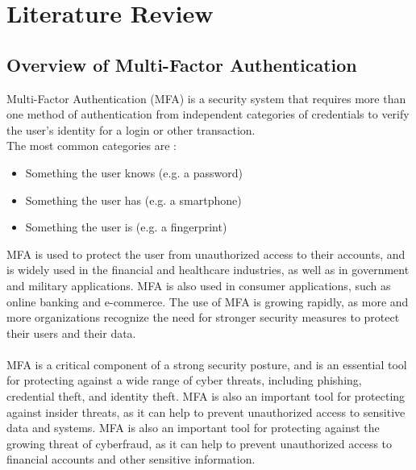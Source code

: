 \documentclass[12pt]{report}
\begin{document}
\newpage
\chapter{Literature Review}
\section{Overview of Multi-Factor Authentication}

Multi-Factor Authentication (MFA) is a security system that requires more than
one method of authentication from independent categories of credentials to verify
the user's identity for a login or other transaction.\\The most common
categories are \cite{mfa}:
\begin{itemize}
	\item Something the user knows (e.g. a password)

	\item Something the user has (e.g. a smartphone)

	\item Something the user is (e.g. a fingerprint)
\end{itemize}
MFA is used to protect the user from unauthorized access to their accounts,
and is widely used in the financial and healthcare industries, as well as in government
and military applications. MFA is also used in consumer applications, such as online
banking and e-commerce. The use of MFA is growing rapidly, as more and more organizations
recognize the need for stronger security measures to protect their users and their
data.\\ \\MFA is a critical component of a strong security posture, and is an
essential tool for protecting against a wide range of cyber threats, including
phishing, credential theft, and identity theft. MFA is also an important tool for
protecting against insider threats, as it can help to prevent unauthorized
access to sensitive data and systems. MFA is also an important tool for protecting
against the growing threat of cyberfraud, as it can help to prevent
unauthorized access to financial accounts and other sensitive information.\\ \\
\end{document}
